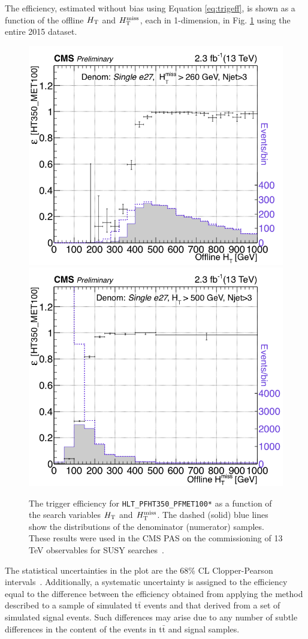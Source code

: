 The efficiency, estimated without bias using Equation \ref{eq:trigeff}, is shown as a function of the offline $H_{\rm T}$ and $H_{\text{T}}^{\rm miss}$, each in 1-dimension, in Fig. \ref{fig:trigger-turnon} using the entire 2015 dataset. 
\begin{figure}[tb!]
  \begin{center}
    \includegraphics[width=0.49\linewidth]{figures/trigger/EffVsHt2_3InvFb.png}
    \includegraphics[width=0.49\linewidth]{figures/trigger/EffVsMht2_3InvFb.png}
    \caption{
      The trigger efficiency for \texttt{HLT\_PFHT350\_PFMET100*} 
      as a function of the search variables $H_{\rm T}$ and $H_{\text{T}}^{\rm miss}$. The dashed (solid) blue
      lines show the distributions of the denominator (numerator) samples. These results were used in the CMS PAS on the commissioning of 13 TeV observables for SUSY searches~\cite{CMS-DP-2015-035}.
      }
    \label{fig:trigger-turnon}
  \end{center}
\end{figure}
The statistical uncertainties in the plot are the 68\% CL Clopper-Pearson
intervals~\cite{Clopper:Pearson}. Additionally, a systematic uncertainty is assigned to the efficiency
equal to the difference between the efficiency obtained from applying the method described to a
sample of simulated t$\bar{\text{t}}$ events and that derived
from a set of simulated signal events. Such differences may arise due to any number of subtle differences in the content of the events in t$\bar{\text{t}}$ and signal samples. 

